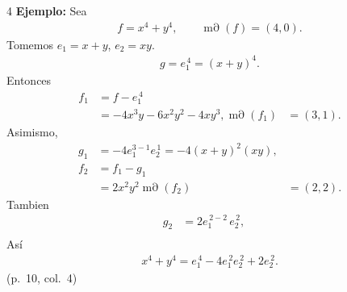\documentclass[landscape,a4paper]{article}
\begin{document}
\begin{multicols}{4}
\noindent \textbf{Ejemplo:} Sea 
\begin{align*}
  f = x^4 + y^4,\qquad \operatorname{m\partial}(f)=(4,0).
\end{align*}
Tomemos $e_1=x+y$, $e_2=xy$.
\begin{align*}
  g = e_1^{\,4} = (x+y)^4.
\end{align*}
Entonces
\begin{align*}
  f_1 &= f - e_1^{\,4}\\ &= -4x^3y - 6x^2y^2 -4xy^3, \operatorname{m\partial}(f_1)&=(3,1).
\end{align*}
Asimismo, 
\begin{align*}
  g_1 &= -4e_1^{3-1}e_2^{\,1} = -4(x+y)^2(xy), \\
  f_2 &= f_1 - g_1 \\
  &= 2x^2y^2 \operatorname{m\partial}(f_2)&=(2,2).
\end{align*}
Tambien
\begin{align*}
  g_2 &= 2 e_1^{\,2-2}\,e_2^{\,2}, \quad\\
\end{align*}
Así 
\begin{align*}
  x^4 + y^4 = e_1^{\,4} - 4e_1^{\,2}e_2^{\,2} + 2e_2^{\,2}.
\end{align*}
(p.~10, col.~4)
\end{multicols}
  
\end{document}
